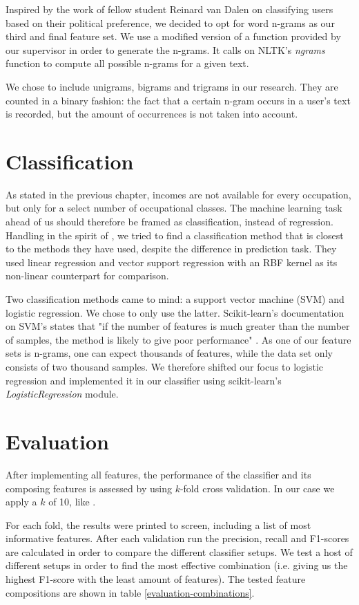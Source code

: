\documentclass[
10pt, %
a4paper, %
oneside, %
headinclude,footinclude, %
] {book}%
\begin{document}
Inspired by the work of fellow student Reinard van Dalen on classifying users based on their political preference, we decided to opt for word n-grams as our third and final feature set. We use a modified version of a function provided by our supervisor in order to generate the n-grams. It calls on NLTK's \textit{ngrams} function to compute all possible n-grams for a given text.

We chose to include unigrams, bigrams and trigrams in our research. They are counted in a binary fashion: the fact that a certain n-gram occurs in a user's text is recorded, but the amount of occurrences is not taken into account.

\section{Classification}
As stated in the previous chapter, incomes are not available for every occupation, but only for a select number of occupational classes. The machine learning task ahead of us should therefore be framed as classification, instead of regression.
Handling in the spirit of \citet{flekova}, we tried to find a classification method that is closest to the methods they have used, despite the difference in prediction task. They used linear regression and vector support regression with an RBF kernel as its non-linear counterpart for comparison. 

Two classification methods came to mind: a support vector machine (SVM) and logistic regression. We chose to only use the latter. Scikit-learn's documentation on SVM's states that "if the number of features is much greater than the number of samples, the method is likely to give poor performance" \citep{svm}.
As one of our feature sets is n-grams, one can expect thousands of features, while the data set only consists of two thousand samples. We therefore shifted our focus to logistic regression and implemented it in our classifier using scikit-learn's \textit{LogisticRegression} module.

\section{Evaluation}
After implementing all features, the performance of the classifier and its composing features is assessed by using $k$-fold cross validation. In our case we apply a $k$ of 10, like \citet{flekova}.

For each fold, the results were printed to screen, including a list of most informative features. After each validation run the precision, recall and F1-scores are calculated in order to compare the different classifier setups. We test a host of different setups in order to find the most effective combination (i.e. giving us the highest F1-score with the least amount of features).  The tested feature compositions are shown in table \ref{evaluation-combinations}.
\end{document}
